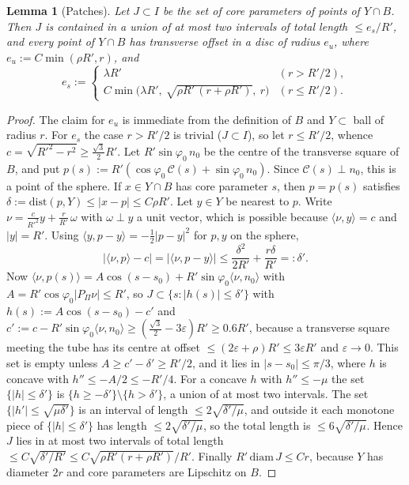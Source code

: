 \documentclass[aps,prx,twocolumn,superscriptaddress,nofootinbib,longbibliography]{revtex4-2}
\theoremstyle{plain}
\newtheorem{lemma}{Lemma}
\theoremstyle{definition}
\theoremstyle{remark}
\begin{document}
\begin{lemma}[Patches]\label{lem:E2}
Let $J\subset I$ be the set of core parameters of points of $Y\cap B$. Then $J$ is contained in a union of at most two intervals of total length $\le e_s/R'$, and every point of $Y\cap B$ has transverse offset in a disc of radius $e_u$, where $e_u:=C\min(\rho R',r)$, and
\[
e_s:=\begin{cases}\lambda R'&(r>R'/2),\\ C\min\big(\lambda R',\ \sqrt{\rho R'\,(r+\rho R')},\ r\big)&(r\le R'/2).\end{cases}
\]
\end{lemma}
\begin{proof}
The claim for $e_u$ is immediate from the definition of $B$ and $Y\subset$ ball of radius $r$. For $e_s$ the case $r>R'/2$ is trivial ($J\subset I$), so let $r\le R'/2$, whence $c=\sqrt{R'^2-r^2}\ge\tfrac{\sqrt3}2R'$. Let $R'\sin\varphi_0\,n_0$ be the centre of the transverse square of $B$, and put $p(s):=R'(\cos\varphi_0\,\mathcal C(s)+\sin\varphi_0\,n_0)$. Since $\mathcal C(s)\perp n_0$, this is a point of the sphere. If $x\in Y\cap B$ has core parameter $s$, then $p=p(s)$ satisfies $\delta:=\mathrm{dist}(p,Y)\le|x-p|\le C\rho R'$. Let $y\in Y$ be nearest to $p$. Write $\nu=\tfrac c{R'^2}y+\tfrac r{R'}\,\omega$ with $\omega\perp y$ a unit vector, which is possible because $\langle\nu,y\rangle=c$ and $|y|=R'$. Using $\langle y,p-y\rangle=-\tfrac12|p-y|^2$ for $p,y$ on the sphere,
\[
|\langle\nu,p\rangle-c|=|\langle\nu,p-y\rangle|\le\frac{\delta^2}{2R'}+\frac{r\delta}{R'}=:\delta'.
\]
Now $\langle\nu,p(s)\rangle=A\cos(s-s_0)+R'\sin\varphi_0\langle\nu,n_0\rangle$ with $A=R'\cos\varphi_0|P_\Pi\nu|\le R'$, so $J\subset\{s:|h(s)|\le\delta'\}$ with $h(s):=A\cos(s-s_0)-c'$ and $c':=c-R'\sin\varphi_0\langle\nu,n_0\rangle\ge(\tfrac{\sqrt3}2-3\varepsilon)R'\ge0.6R'$, because a transverse square meeting the tube has its centre at offset $\le(2\varepsilon+\rho)R'\le3\varepsilon R'$ and $\varepsilon\to0$. This set is empty unless $A\ge c'-\delta'\ge R'/2$, and it lies in $|s-s_0|\le\pi/3$, where $h$ is concave with $h''\le-A/2\le-R'/4$. For a concave $h$ with $h''\le-\mu$ the set $\{|h|\le\delta'\}$ is $\{h\ge-\delta'\}\setminus\{h>\delta'\}$, a union of at most two intervals. The set $\{|h'|\le\sqrt{\mu\delta'}\}$ is an interval of length $\le2\sqrt{\delta'/\mu}$, and outside it each monotone piece of $\{|h|\le\delta'\}$ has length $\le2\sqrt{\delta'/\mu}$, so the total length is $\le6\sqrt{\delta'/\mu}$. Hence $J$ lies in at most two intervals of total length $\le C\sqrt{\delta'/R'}\le C\sqrt{\rho R'(r+\rho R')}/R'$. Finally $R'\,\mathrm{diam}\,J\le Cr$, because $Y$ has diameter $2r$ and core parameters are Lipschitz on $B$.
\end{proof}
\end{document}
